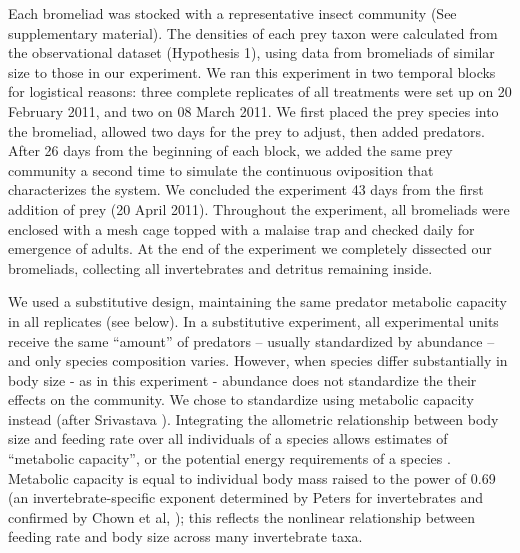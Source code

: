 Each bromeliad was stocked with a representative insect community (See
supplementary material). The densities of each prey taxon were
calculated from the observational dataset (Hypothesis 1), using data
from bromeliads of similar size to those in our experiment. We ran this
experiment in two temporal blocks for logistical reasons: three complete
replicates of all treatments were set up on 20 February 2011, and two on
08 March 2011. We first placed the prey species into the bromeliad,
allowed two days for the prey to adjust, then added predators. After 26
days from the beginning of each block, we added the same prey community
a second time to simulate the continuous oviposition that characterizes
the system. We concluded the experiment 43 days from the first addition
of prey (20 April 2011). Throughout the experiment, all bromeliads were
enclosed with a mesh cage topped with a malaise trap and checked daily
for emergence of adults. At the end of the experiment we completely
dissected our bromeliads, collecting all invertebrates and detritus
remaining inside.

We used a substitutive design, maintaining the same predator metabolic
capacity in all replicates (see below). In a substitutive experiment,
all experimental units receive the same ``amount'' of predators --
usually standardized by abundance -- and only species composition
varies. However, when species differ substantially in body size - as in
this experiment - abundance does not standardize the their effects on
the community. We chose to standardize using metabolic capacity instead
(after Srivastava \citeyearpar{Srivastava2009a}). Integrating the
allometric relationship between body size and feeding rate
\citep{Brown2004, Wilby2005} over all individuals of a species allows
estimates of ``metabolic capacity'', or the potential energy
requirements of a species \citep{Srivastava2009a}. Metabolic capacity is
equal to individual body mass raised to the power of 0.69 (an
invertebrate-specific exponent determined by Peters
\citeyearpar{Peters1986} for invertebrates and confirmed by Chown et al,
\citeyearpar{Chown2007}); this reflects the nonlinear relationship
between feeding rate and body size across many invertebrate taxa.

